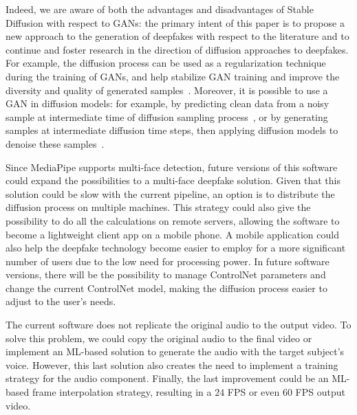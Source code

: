 \documentclass[preprint]{elsarticle}
\begin{document}
Indeed, we are aware of both the advantages and disadvantages of Stable Diffusion with respect to GANs: the primary intent of this paper is to propose a new approach to the generation of deepfakes with respect to the literature and to continue and foster research in the direction of diffusion approaches to deepfakes. For example, the diffusion process can be used as a regularization technique during the training of GANs, and help stabilize GAN training and improve the diversity and quality of generated samples~\cite{mix}.
Moreover, it is possible to use a GAN  in diffusion models: for example, by predicting clean data from a noisy sample at intermediate time of diffusion sampling process~\cite{ganindiff1}, or by generating samples at intermediate diffusion time steps, then applying diffusion models to denoise these samples~\cite{ganindiff2}.


Since MediaPipe supports multi-face detection, future versions of this software could expand the possibilities to a multi-face deepfake solution. Given that this solution could be slow with the current pipeline, an option is to distribute the diffusion process on multiple machines. This strategy could also give the possibility to do all the calculations on remote servers, allowing the software to become a lightweight client app on a mobile phone. A mobile application could also help the deepfake technology become easier to employ for a more significant number of users due to the low need for processing power. In future software versions, there will be the possibility to manage ControlNet parameters and change the current ControlNet model, making the diffusion process easier to adjust to the user's needs.

The current software does not replicate the original audio to the output video. To solve this problem, we could copy the original audio to the final video or implement an ML-based solution to generate the audio with the target subject's voice. However, this last solution also creates the need to implement a training strategy for the audio component. Finally, the last improvement could be an ML-based frame interpolation strategy, resulting in a $24$ FPS or even $60$ FPS output video.



  

\end{document}
